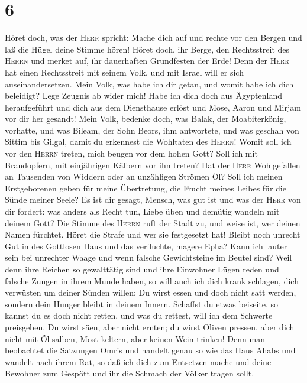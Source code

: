 \hypertarget{section-5}{%
\section{6}\label{section-5}}

 Höret doch, was der \textsc{Herr} spricht: Mache dich auf
und rechte vor den Bergen und laß die Hügel deine Stimme hören!
 Höret doch, ihr Berge, den Rechtsstreit des
\textsc{Herrn} und merket auf, ihr dauerhaften Grundfesten der Erde!
Denn der \textsc{Herr} hat einen Rechtsstreit mit seinem Volk, und mit
Israel will er sich auseinandersetzen.  Mein Volk, was
habe ich dir getan, und womit habe ich dich beleidigt? Lege Zeugnis ab
wider mich!  Habe ich dich doch aus Ägyptenland
heraufgeführt und dich aus dem Diensthause erlöst und Mose, Aaron und
Mirjam vor dir her gesandt!  Mein Volk, bedenke doch, was
Balak, der Moabiterkönig, vorhatte, und was Bileam, der Sohn Beors, ihm
antwortete, und was geschah von Sittim bis Gilgal, damit du erkennest
die Wohltaten des \textsc{Herrn}!  Womit soll ich vor den
\textsc{Herrn} treten, mich beugen vor dem hohen Gott? Soll ich mit
Brandopfern, mit einjährigen Kälbern vor ihn treten?  Hat
der \textsc{Herr} Wohlgefallen an Tausenden von Widdern oder an
unzähligen Strömen Öl? Soll ich meinen Erstgeborenen geben für meine
Übertretung, die Frucht meines Leibes für die Sünde meiner Seele?
 Es ist dir gesagt, Mensch, was gut ist und was der
\textsc{Herr} von dir fordert: was anders als Recht tun, Liebe üben und
demütig wandeln mit deinem Gott?  Die Stimme des
\textsc{Herrn} ruft der Stadt zu, und weise ist, wer deinen Namen
fürchtet. Höret die Strafe und wer sie festgesetzt hat! 
Bleibt noch unrecht Gut in des Gottlosen Haus und das verfluchte, magere
Epha?  Kann ich lauter sein bei unrechter Waage und wenn
falsche Gewichtsteine im Beutel sind?  Weil denn ihre
Reichen so gewalttätig sind und ihre Einwohner Lügen reden und falsche
Zungen in ihrem Munde haben,  so will auch ich dich krank
schlagen, dich verwüsten um deiner Sünden willen:  Du
wirst essen und doch nicht satt werden, sondern dein Hunger bleibt in
deinem Innern. Schaffst du etwas beiseite, so kannst du es doch nicht
retten, und was du rettest, will ich dem Schwerte preisgeben.
 Du wirst säen, aber nicht ernten; du wirst Oliven
pressen, aber dich nicht mit Öl salben, Most keltern, aber keinen Wein
trinken!  Denn man beobachtet die Satzungen Omris und
handelt genau so wie das Haus Ahabs und wandelt nach ihrem Rat, so daß
ich dich zum Entsetzen mache und deine Bewohner zum Gespött und ihr die
Schmach der Völker tragen sollt.

